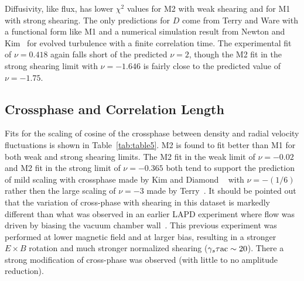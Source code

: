 \documentclass[aip,pop,amsmath,amssymb,reprint,superscriptaddress]{revtex4-1} %
\begin{document}
Diffusivity, like flux, has lower $\chi^{2}$ values for M2 with weak shearing and for M1 with strong shearing. The only predictions for $D$ come from Terry and Ware with a functional form like M1 and a numerical simulation result from Newton and Kim~\cite{newton11} for evolved turbulence with a finite correlation time. The experimental fit of $\nu = 0.418$ again falls short of the predicted $\nu = 2$, though the M2 fit in the strong shearing limit with $\nu = -1.646$ is fairly close to the predicted value of $\nu = -1.75$.


\subsection{Crossphase and Correlation Length}

Fits for the scaling of cosine of the crossphase between density and radial velocity fluctuations is shown in Table~\ref{tab:table5}. M2 is found to fit better than M1 for both weak and strong shearing limits. The M2 fit in the weak limit of $\nu = -0.02$ and M2 fit in the strong limit of $\nu = -0.365$ both tend to support the prediction of mild scaling with crossphase made by Kim and Diamond ~\cite{kim03,kim04} with $\nu = -(1/6)$ rather then the large scaling of $\nu = -3$ made by Terry~\cite{terry01}. It should be pointed out that the variation of cross-phase with shearing in this dataset is markedly different than what was observed in an earlier LAPD experiment where flow was driven by biasing the vacuum chamber wall~\cite{carter09}.  This previous experiment was performed at lower magnetic field and at larger bias, resulting in a stronger $E\times B$ rotation and much stronger normalized shearing ($\gamma_s\tau{\rm ac} \sim 20$).  There a strong modification of cross-phase was observed (with little to no amplitude reduction).  
\end{document}

